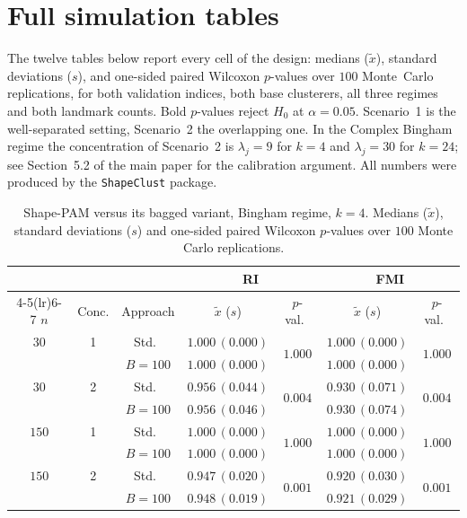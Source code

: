 \documentclass[11pt,a4paper]{article}
\begin{document}
\clearpage

\section{Full simulation tables}
\label{sec:full-sim-tables}

The twelve tables below report every cell of the design: medians
($\tilde x$), standard deviations ($s$), and one-sided paired Wilcoxon
$p$-values over $100$ Monte~Carlo replications, for both validation
indices, both base clusterers, all three regimes and both landmark
counts. Bold $p$-values reject $H_0$ at $\alpha=0.05$. Scenario~1 is the
well-separated setting, Scenario~2 the overlapping one. In the Complex
Bingham regime the concentration of Scenario~2 is $\lambda_j=9$ for $k=4$
and $\lambda_j=30$ for $k=24$; see Section~5.2 of the main paper for the
calibration argument. All numbers were produced by the \texttt{ShapeClust}
package.

\begin{table}[h]
\centering
\caption{Shape-PAM versus its bagged variant, Bingham regime, $k=4$. Medians ($\tilde x$), standard deviations ($s$) and one-sided paired Wilcoxon $p$-values over $100$ Monte Carlo replications.}
\label{tab:pam-bing-k4}
\footnotesize
\begin{tabular}{cc c cc cc}
\toprule
& & & \multicolumn{2}{c}{\textbf{RI}} & \multicolumn{2}{c}{\textbf{FMI}} \\
\cmidrule(lr){4-5}\cmidrule(lr){6-7}
$n$ & Conc. & Approach & $\tilde x$ ($s$) & $p$-val.\ & $\tilde x$ ($s$) & $p$-val.\ \\
\midrule
$30$ & 1 & Std.\ & $1.000\,(0.000)$ & \multirow{2}{*}{$1.000$} & $1.000\,(0.000)$ & \multirow{2}{*}{$1.000$} \\
     &   & $B{=}100$ & $1.000\,(0.000)$ & & $1.000\,(0.000)$ & \\
$30$ & 2 & Std.\ & $0.956\,(0.044)$ & \multirow{2}{*}{$\mathbf{0.004}$} & $0.930\,(0.071)$ & \multirow{2}{*}{$\mathbf{0.004}$} \\
     &   & $B{=}100$ & $0.956\,(0.046)$ & & $0.930\,(0.074)$ & \\
$150$ & 1 & Std.\ & $1.000\,(0.000)$ & \multirow{2}{*}{$1.000$} & $1.000\,(0.000)$ & \multirow{2}{*}{$1.000$} \\
     &   & $B{=}100$ & $1.000\,(0.000)$ & & $1.000\,(0.000)$ & \\
$150$ & 2 & Std.\ & $0.947\,(0.020)$ & \multirow{2}{*}{$\mathbf{0.001}$} & $0.920\,(0.030)$ & \multirow{2}{*}{$\mathbf{0.001}$} \\
     &   & $B{=}100$ & $0.948\,(0.019)$ & & $0.921\,(0.029)$ & \\
\bottomrule
\end{tabular}
\end{table}
\end{document}
